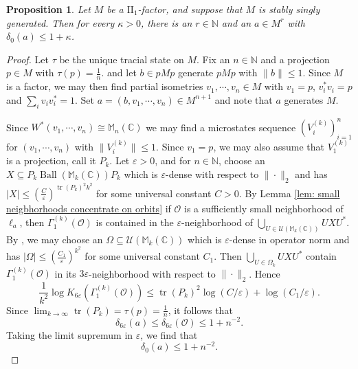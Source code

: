 \documentclass[10pt]{amsart}
\newtheorem{prop}[thm]{Proposition}
\theoremstyle{definition}
\numberwithin{equation}{section}
\newcommand{\bC}{{\mathbb C}}
\newcommand{\bM}{{\mathbb M}}
\newcommand{\bN}{{\mathbb N}}
\newcommand{\cU}{{\mathcal U}}
\DeclareMathOperator{\tr}{tr}
\DeclareMathOperator{\Ball}{Ball}
\begin{document}
\begin{prop}\label{prop: gen with small entropy}
Let $M$ be a $\textrm{II}_{1}$-factor, and suppose that $M$ is stably singly generated. Then for every $\kappa>0$, there is an $r\in \bN$ and an $a\in M^{r}$ with $\delta_{0}(a)\leq 1+\kappa$. 
\end{prop}

\begin{proof}
Let $\tau$ be the unique tracial state on $M$. 
Fix an $n\in \bN$ and a projection $p\in M$ with $\tau(p)=\frac{1}{n}$. and let $b\in pMp$ generate $pMp$ with $\|b\|\leq 1$. Since $M$ is a factor, we may then find partial isometries $v_{1},\cdots,v_{n}\in M$ with $v_{1}=p$, $v_{i}^{*}v_{i}=p$ and $\sum_{i}v_{i}v_{i}^{*}=1$.  Set $a=(b,v_{1},\cdots,v_{n})\in M^{n+1}$ and note that $a$ generates $M$. 

Since $W^{*}(v_{1},\cdots,v_{n})\cong \bM_{n}(\bC)$ we may find a microstates sequence $(V_{i}^{(k)})_{i=1}^{n}$ for $(v_{1},\cdots,v_{n})$ with $\|V_{i}^{(k)}\|\leq 1$. Since $v_{1}=p$, we may also assume that $V_{1}^{(k)}$ is a projection, call it $P_{k}$. 
Let $\varepsilon>0$, and for $n\in \bN$, choose an $X\subseteq P_{k}\Ball(\bM_{k}(\bC))P_{k}$ which is $\varepsilon$-dense with respect to $\|\cdot\|_{2}$ and has $|X|\leq \left(\frac{C}{\varepsilon}\right)^{\tr(P_{k})^{2}k^{2}}$ for some universal constant $C>0$.
By Lemma \ref{lem: small neigbhorhoods concentrate on orbits} if $\mathcal{O}$ is a sufficiently small neighborhood of $\ell_{a}$, then $\Gamma^{(k)}_{1}(\mathcal{O})$ is contained in the $\varepsilon$-neighborhood of $\bigcup_{U\in \cU(\bM_{k}(\bC))}UXU^{*}$.
By \cite[Theorem 7]{Szarek}, we may choose an $\Omega\subseteq \cU(\bM_{k}(\bC))$ which is $\varepsilon$-dense in operator norm and has $|\Omega|\leq \left(\frac{C_{1}}{\varepsilon}\right)^{k^{2}}$ for some universal constant $C_{1}$. Then $\bigcup_{U\in \Omega_{k}}UXU^{*}$ contain $\Gamma^{(k)}_{1}(\mathcal{O})$ in its $3\varepsilon$-neighborhood with respect to $\|\cdot\|_{2}$. Hence
\[\frac{1}{k^{2}}\log K_{6\varepsilon}(\Gamma^{(k)}_{1}(\mathcal{O}))\leq \tr(P_{k})^{2}\log(C/\varepsilon)+\log(C_{1}/\varepsilon).\]
Since $\lim_{k\to\infty}\tr(P_{k})=\tau(p)=\frac{1}{n}$, it follows that
\[\delta_{6\varepsilon}(a)\leq \delta_{6\varepsilon}(\mathcal{O})\leq 1+n^{-2}.\]
Taking the limit supremum in $\varepsilon$, we find that 
\[\delta_{0}(a)\leq 1+n^{-2}.\]
\end{proof}
\end{document}
